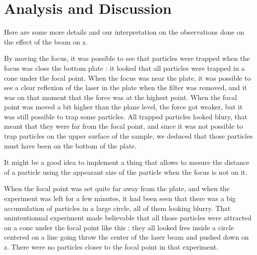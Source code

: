\documentclass[a4paper,12pt,twoside]{article}	%
\begin{document}
\section{Analysis and Discussion}

Here are some more details and our interpretation on the observations done on the effect of the beam on z.

By moving the focus, it was possible to see that particles were trapped when the focus was close the bottom plate : it looked that all particles were trapped in a cone under the focal point. When the focus was near the plate, it was possible to see a clear reflexion of the laser in the plate when the filter was removed, and it was on that moment that the force was at the highest point. When the focal point was moved a bit higher than the plane level, the force got weaker, but it was still possible to trap some particles. All trapped particles looked blury, that meant that they were far from the focal point, and since it was not possible to trap particles on the upper surface of the sample, we deduced that those particles must have been on the bottom of the plate.

It might be a good idea to implement a thing that allows to mesure the distance of a particle using the appearant size of the particle when the focus is not on it.

When the focal point was set quite far away from the plate, and when the experiment was left for a few minutes, it had been seen that there was a big accumulation of particles in a large circle, all of them looking blurry. That unintentionnal experiment made believable that all those particles were attracted on a cone under the focal point like this : they all looked free inside a circle centered on a line going throw the center of the laser beam and pushed down on z. There were no particles closer to the focal point in that experiment.
\end{document}
